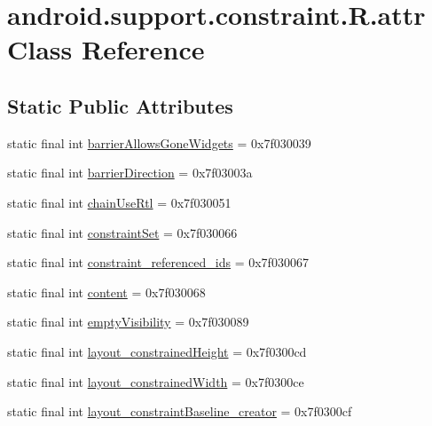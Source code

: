 \hypertarget{classandroid_1_1support_1_1constraint_1_1_r_1_1attr}{}\section{android.\+support.\+constraint.\+R.\+attr Class Reference}
\label{classandroid_1_1support_1_1constraint_1_1_r_1_1attr}
\subsection*{Static Public Attributes}
\begin{DoxyCompactItemize}
\item 
static final int \mbox{\hyperlink{classandroid_1_1support_1_1constraint_1_1_r_1_1attr_aa121264d5f5a1cd66234e631c12239ca}{barrier\+Allows\+Gone\+Widgets}} = 0x7f030039
\item 
static final int \mbox{\hyperlink{classandroid_1_1support_1_1constraint_1_1_r_1_1attr_a0535c33aa16234bdf4c5046b3a81cd00}{barrier\+Direction}} = 0x7f03003a
\item 
static final int \mbox{\hyperlink{classandroid_1_1support_1_1constraint_1_1_r_1_1attr_a74ce6b9ad2b2fdb5cf1a275b9de5e2d9}{chain\+Use\+Rtl}} = 0x7f030051
\item 
static final int \mbox{\hyperlink{classandroid_1_1support_1_1constraint_1_1_r_1_1attr_ae52cf5695204b7da3ea816100b4244e5}{constraint\+Set}} = 0x7f030066
\item 
static final int \mbox{\hyperlink{classandroid_1_1support_1_1constraint_1_1_r_1_1attr_a739014bcaf4522829fdefe54bda4570a}{constraint\+\_\+referenced\+\_\+ids}} = 0x7f030067
\item 
static final int \mbox{\hyperlink{classandroid_1_1support_1_1constraint_1_1_r_1_1attr_a99685748ba1613065bd51960c9270402}{content}} = 0x7f030068
\item 
static final int \mbox{\hyperlink{classandroid_1_1support_1_1constraint_1_1_r_1_1attr_aa29ef6ddd19098fcd7946e9e425594d3}{empty\+Visibility}} = 0x7f030089
\item 
static final int \mbox{\hyperlink{classandroid_1_1support_1_1constraint_1_1_r_1_1attr_aa1e778780c419486980d22a51cccb7cc}{layout\+\_\+constrained\+Height}} = 0x7f0300cd
\item 
static final int \mbox{\hyperlink{classandroid_1_1support_1_1constraint_1_1_r_1_1attr_a6a8cbac1c85126602c959b70d2ba5e2e}{layout\+\_\+constrained\+Width}} = 0x7f0300ce
\item 
static final int \mbox{\hyperlink{classandroid_1_1support_1_1constraint_1_1_r_1_1attr_a8ccd5dd490cb4cb5b3ee77215d7e1206}{layout\+\_\+constraint\+Baseline\+\_\+creator}} = 0x7f0300cf

\end{DoxyCompactItemize}
